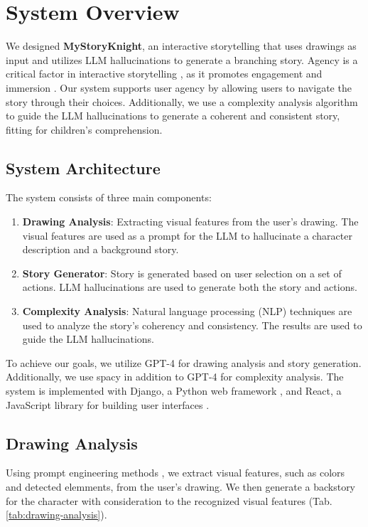 \documentclass[submit,techrep,english]{ipsj}
\begin{document}
\section{System Overview}
\label{sec:system-overview}
We designed \textbf{MyStoryKnight}, an interactive storytelling that uses drawings as input and utilizes LLM hallucinations to generate a branching story. Agency is a critical factor in interactive storytelling \cite{11:LimaGV20}, as it promotes engagement and immersion \cite{12:ZhangXWYRWYWL22}. Our system supports user agency by allowing users to navigate the story through their choices. Additionally, we use a complexity analysis algorithm to guide the LLM hallucinations to generate a coherent and consistent story, fitting for children's comprehension.

\subsection{System Architecture}
\label{subsec:system-architecture}
The system consists of three main components:
\begin{enumerate}
    \item \textbf{Drawing Analysis}: Extracting visual features from the user's drawing. The visual features are used as a prompt for the LLM to hallucinate a character description and a background story.
    \item \textbf{Story Generator}: Story is generated based on user selection on a set of actions. LLM hallucinations are used to generate both the story and actions.
    \item \textbf{Complexity Analysis}: Natural language processing (NLP) techniques are used to analyze the story's coherency and consistency. The results are used to guide the LLM hallucinations.
\end{enumerate}
To achieve our goals, we utilize GPT-4 \cite{16:abs-2303-08774} for drawing analysis and story generation. Additionally, we use spacy \cite{17:spacy} in addition to GPT-4 for complexity analysis. The system is implemented with Django, a Python web framework \cite{18:django}, and React, a JavaScript library for building user interfaces \cite{19:react}.

\subsection{Drawing Analysis}
\label{subsec:drawing-analysis}
Using prompt engineering methods \cite{22:abs-2302-11382}, we extract visual features, such as colors and detected elemments, from the user's drawing. We then generate a backstory for the character with consideration to the recognized visual features (Tab. \ref{tab:drawing-analysis}).
\end{document}
